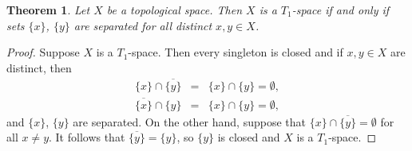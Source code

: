 \documentclass[12pt]{article}
\newtheorem{thm}{Theorem}
\begin{document}
\begin{thm} Let $X$ be a topological space. Then $X$ is a $T_1$-space
if and only if sets $\{x\}$, $\{y\}$
 are separated for all distinct $x,y\in X$. 
\end{thm}

\begin{proof} Suppose $X$ is a $T_1$-space. Then every singleton is
closed and if $x,y\in X$ are distinct, then 
\begin{eqnarray*}
   \{x\} \cap \overline{\{y\}} &=& \{x\} \cap \{y\} =\emptyset, \\
  \overline{ \{x\} }\cap \{y\} &=& \{x\} \cap \{y\} =\emptyset, 
\end{eqnarray*}
and $\{x\}$, $\{y\}$ are separated.
On the other hand, suppose that 
  $\{x\} \cap \overline{\{y\}}  =\emptyset$
for all $x\neq y$. It follows that $\overline{\{y\}}=\{y\}$, so $\{y\}$
is closed and $X$ is a $T_1$-space. 
\end{proof}
\end{document}
